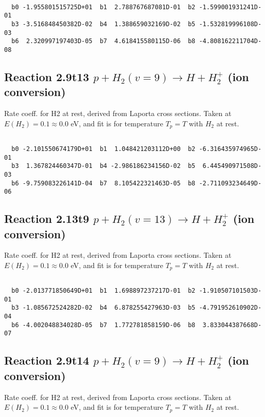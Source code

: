 \begin{small}\begin{verbatim}

  b0 -1.955801515725D+01  b1  2.788767687081D-01  b2 -1.599001931241D-01
  b3 -3.516848450382D-02  b4  1.388659032169D-02  b5 -1.532819996108D-03
  b6  2.320997197403D-05  b7  4.618415580115D-06  b8 -4.808162211704D-08

\end{verbatim}\end{small}

\newpage
\subsection{
Reaction 2.9t13
$ p + H_2(v=9) \rightarrow H + H_2^+$ (ion conversion)
}
Rate coeff. for H2 at rest, derived from Laporta cross sections.
Taken at $E(H_2) = 0.1 \approx 0.0$ eV,  and fit is for temperature $T_p=T$ with $H_2$ at rest.

\begin{small}\begin{verbatim}

  b0 -2.101550674179D+01  b1  1.048421203112D+00  b2 -6.316435974965D-01
  b3  1.367824460347D-01  b4 -2.986186234156D-02  b5  6.445490971508D-03
  b6 -9.759083226141D-04  b7  8.105422321463D-05  b8 -2.711093234649D-06

\end{verbatim}\end{small}

\newpage
\subsection{
Reaction 2.13t9
$ p + H_2(v=13) \rightarrow H + H_2^+$ (ion conversion)
}
Rate coeff. for H2 at rest, derived from Laporta cross sections.
Taken at $E(H_2) = 0.1 \approx 0.0$ eV,  and fit is for temperature $T_p=T$ with $H_2$ at rest.

\begin{small}\begin{verbatim}

  b0 -2.013771850649D+01  b1  1.698897237217D-01  b2 -1.910507101503D-01
  b3 -1.085672524282D-02  b4  6.878255427963D-03  b5 -4.791952610902D-04
  b6 -4.002048834028D-05  b7  1.772781858159D-06  b8  3.833044387668D-07

\end{verbatim}\end{small}

\newpage
\subsection{
Reaction 2.9t14
$ p + H_2(v=9) \rightarrow H + H_2^+$ (ion conversion)
}
Rate coeff. for H2 at rest, derived from Laporta cross sections.
Taken at $E(H_2) = 0.1 \approx 0.0$ eV,  and fit is for temperature $T_p=T$ with $H_2$ at rest.


